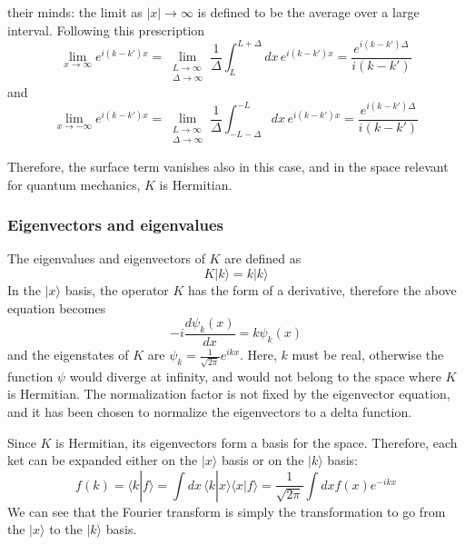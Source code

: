 \documentclass[11pt,fleqn]{book} %
\newcommand{\ket}[1]{| #1\rangle}
\newcommand{\scalar}[2]{\langle #1| #2\rangle}
\begin{document}
their minds: the limit as $|x|\to\infty$ is defined to be the average over a large interval. Following this prescription
\begin{equation*}
    \lim_{x\to\infty}e^{i(k-k')x} = 
    \lim_{\substack{L\to\infty\\\Delta\to\infty}}\frac{1}{\Delta}\int_L^{L+\Delta}\!\!dx\,e^{i(k-k')x} =
    \frac{e^{i(k-k')\Delta}}{i(k-k')}    
\end{equation*}
and
\begin{equation*}
    \lim_{x\to-\infty}e^{i(k-k')x} = 
    \lim_{\substack{L\to\infty\\\Delta\to\infty}}\frac{1}{\Delta}\int_{-L-\Delta}^{-L}\!\!dx\,e^{i(k-k')x} =
    \frac{e^{i(k-k')\Delta}}{i(k-k')}
\end{equation*}

Therefore, the surface term vanishes also in this case, and in the space relevant for quantum mechanics, $K$ is Hermitian.

\subsubsection{Eigenvectors and eigenvalues}
The eigenvalues and eigenvectors of $K$ are defined as
\begin{equation*}
    K\ket{k} = k\ket{k}
\end{equation*}
In the $\ket{x}$ basis, the operator $K$ has the form of a derivative, therefore the above equation becomes
\begin{equation*}
    -i\frac{d\psi_k(x)}{dx} = k\psi_k(x)
\end{equation*}
and the eigenstates of $K$ are $\psi_k=\frac{1}{\sqrt{2\pi}}e^{ikx}$. Here, $k$ must be real, otherwise the function $\psi$ would diverge
at infinity, and would not belong to the space where $K$ is Hermitian. The normalization factor is not fixed by the eigenvector equation, and it has
been chosen to normalize the eigenvectors to a delta function.

Since $K$ is Hermitian, its eigenvectors form a basis for the space. Therefore, each ket can be expanded either on the $\ket{x}$ basis or on the
$\ket{k}$ basis:
\begin{equation*}
    f(k) = \scalar{k}{f} = \int\!\!dx\,\scalar{k}{x}\scalar{x}{f} = \frac{1}{\sqrt{2\pi}}\int\!\!dx f(x) e^{-ikx}
\end{equation*}
We can see that the Fourier transform is simply the transformation to go from the $\ket{x}$ to the $\ket{k}$ basis.
\end{document}
